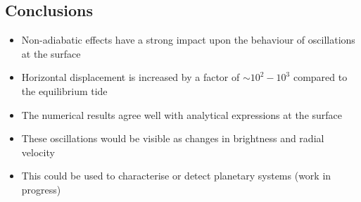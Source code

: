 \documentclass[a0,portrait]{a0poster}
\begin{document}
\begin{multicols}{2}
\begin{tcolorbox}[colframe=black,colback=blue!10!white]
\vspace{0.5cm}

\end{tcolorbox}


\color{Black}

\begin{tcolorbox}[colframe=black,colback=blue!10!white]

\vspace{0.5cm}

\section*{Conclusions}

\large

\begin{itemize}
\item Non-adiabatic effects have a strong impact upon the behaviour of oscillations at the surface
\item Horizontal displacement is increased by a factor of $\sim 10^{2} - 10^{3}$ compared to the equilibrium tide
\item The numerical results agree well with analytical expressions at the surface
\item These oscillations would be visible as changes in brightness and radial velocity
\item This could be used to characterise or detect planetary systems (work in progress)
\end{itemize}
\vspace{0.5cm}

\normalsize

\end{tcolorbox}

\color{Black} %








\end{multicols}
\end{document}
